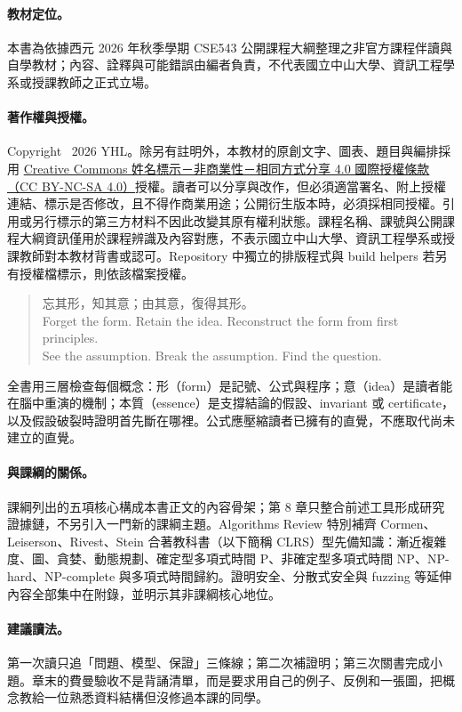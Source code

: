 \documentclass[11pt,a4paper,oneside,openany]{book}
\begin{document}
\paragraph{教材定位。}
本書為依據西元 2026 年秋季學期 CSE543 公開課程大綱整理之非官方課程伴讀與自學教材；內容、詮釋與可能錯誤由編者負責，不代表國立中山大學、資訊工程學系或授課教師之正式立場。

\paragraph{著作權與授權。}
Copyright \textcopyright\ 2026 YHL。除另有註明外，本教材的原創文字、圖表、題目與編排採用 \href{https://creativecommons.org/licenses/by-nc-sa/4.0/}{Creative Commons 姓名標示－非商業性－相同方式分享 4.0 國際授權條款（CC BY-NC-SA 4.0）}授權。讀者可以分享與改作，但必須適當署名、附上授權連結、標示是否修改，且不得作商業用途；公開衍生版本時，必須採相同授權。引用或另行標示的第三方材料不因此改變其原有權利狀態。課程名稱、課號與公開課程大綱資訊僅用於課程辨識及內容對應，不表示國立中山大學、資訊工程學系或授課教師對本教材背書或認可。Repository 中獨立的排版程式與 build helpers 若另有授權檔標示，則依該檔案授權。

\begin{quote}
\centering
\sffamily\large
忘其形，知其意；由其意，復得其形。\\[.35em]
\normalsize Forget the form. Retain the idea. Reconstruct the form from first principles.\\[.8em]
See the assumption. Break the assumption. Find the question.
\end{quote}

全書用三層檢查每個概念：形（form）是記號、公式與程序；意（idea）是讀者能在腦中重演的機制；本質（essence）是支撐結論的假設、invariant 或 certificate，以及假設破裂時證明首先斷在哪裡。公式應壓縮讀者已擁有的直覺，不應取代尚未建立的直覺。

\paragraph{與課綱的關係。}
課綱列出的五項核心構成本書正文的內容骨架；第 8 章只整合前述工具形成研究證據鏈，不另引入一門新的課綱主題。Algorithms Review 特別補齊 Cormen、Leiserson、Rivest、Stein 合著教科書（以下簡稱 CLRS）型先備知識：漸近複雜度、圖、貪婪、動態規劃、確定型多項式時間 P、非確定型多項式時間 NP、NP-hard、NP-complete 與多項式時間歸約。證明安全、分散式安全與 fuzzing 等延伸內容全部集中在附錄，並明示其非課綱核心地位。

\paragraph{建議讀法。}
第一次讀只追「問題、模型、保證」三條線；第二次補證明；第三次關書完成小題。章末的費曼驗收不是背誦清單，而是要求用自己的例子、反例和一張圖，把概念教給一位熟悉資料結構但沒修過本課的同學。
\end{document}
